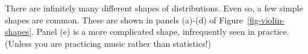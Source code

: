 \documentclass[
  letterpaper,
  DIV=11,
  numbers=noendperiod,
  oneside]{scrartcl}
\begin{document}
There are infinitely many different shapes of distributions. Even so, a
few simple shapes are common. These are shown in panels (a)-(d) of
Figure~\ref{fig-violin-shapes}. Panel (e) is a more complicated shape,
infrequently seen in practice. (Unless you are practicing music rather
than statistics!)

\begin{figure}

\begin{minipage}{0.20\linewidth}



\end{minipage}%
%
\begin{minipage}{0.20\linewidth}

\end{minipage}
\end{figure}
\end{document}
